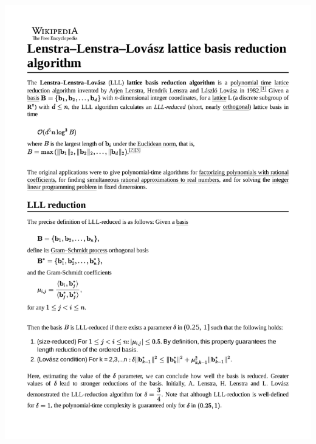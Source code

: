 \documentclass{beamer}
\begin{document}
\begin{frame}
\includegraphics[page=3,clip,trim=0in 7.5in 0in 1in, width=\textwidth]{Lenstra–Lenstra–Lovasz_lattice_basis_reduction_algorithm.pdf}
\end{frame}
\end{document}
